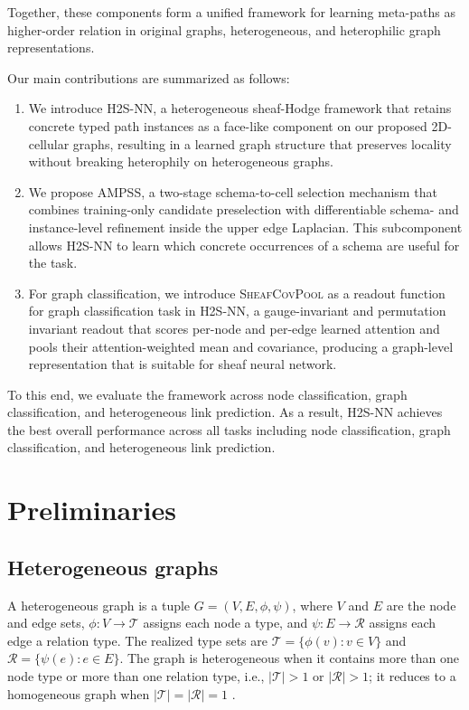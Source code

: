 \documentclass[sigconf,anonymous,review]{acmart}
\newcommand{\method}{\textsc{H2S-NN}}
\newcommand{\ampss}{\textsc{AMPSS}}
\newcommand{\sheafcovpool}{\textsc{SheafCovPool}}
\begin{document}
Together, these components form a unified framework for learning meta-paths as higher-order relation in original graphs, heterogeneous, and heterophilic graph representations.




Our main contributions are summarized as follows:
\begin{enumerate}
  \item We introduce \method{}, a heterogeneous sheaf-Hodge framework that retains concrete typed
  path instances as a face-like component on our proposed 2D-cellular graphs, resulting in a learned graph structure that preserves locality without breaking heterophily on heterogeneous graphs.
  \item We propose \ampss{}, a two-stage schema-to-cell selection mechanism that combines
  training-only candidate preselection with differentiable schema- and instance-level refinement
  inside the upper edge Laplacian. This subcomponent allows \method{} to learn which concrete occurrences
  of a schema are useful for the task.
  \item For graph classification, we introduce \sheafcovpool{} as a readout function for graph classification task in \method{}, a gauge-invariant and permutation invariant readout that scores per-node and per-edge learned attention and pools their
  attention-weighted mean and covariance, producing a graph-level representation that is suitable for sheaf neural network.
\end{enumerate}

To this end, we evaluate the framework across node classification, graph classification, and
heterogeneous link prediction. As a result, \method{} achieves the best overall performance across all tasks including node classification, graph classification, and heterogeneous link prediction.

\section{Preliminaries}
\label{sec:background}


\subsection{Heterogeneous graphs}

A heterogeneous graph is a tuple $G=(V,E,\phi,\psi)$, where $V$ and $E$ are the node and edge
sets, $\phi:V\rightarrow\mathcal{T}$ assigns each node a type, and
$\psi:E\rightarrow\mathcal{R}$ assigns each edge a relation type. The realized type sets are
$\mathcal{T}=\{\phi(v):v\in V\}$ and $\mathcal{R}=\{\psi(e):e\in E\}$. The graph is heterogeneous
when it contains more than one node type or more than one relation type, i.e.,
$|\mathcal{T}|>1$ or $|\mathcal{R}|>1$; it reduces to a homogeneous graph when
$|\mathcal{T}|=|\mathcal{R}|=1$ \cite{lu2026addressing}.
\end{document}
